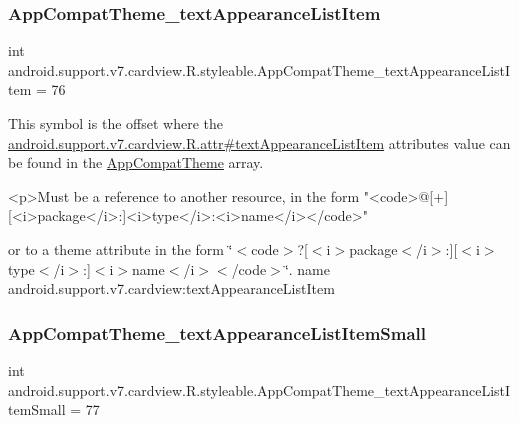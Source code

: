 \subsubsection{\texorpdfstring{App\+Compat\+Theme\+\_\+text\+Appearance\+List\+Item}{AppCompatTheme\_textAppearanceListItem}}
{\footnotesize\ttfamily int android.\+support.\+v7.\+cardview.\+R.\+styleable.\+App\+Compat\+Theme\+\_\+text\+Appearance\+List\+Item = 76\hspace{0.3cm}{\ttfamily [static]}}

This symbol is the offset where the \hyperlink{classandroid_1_1support_1_1v7_1_1cardview_1_1R_1_1attr_a504a1e2232cabe69718c28f8f8e1f022}{android.\+support.\+v7.\+cardview.\+R.\+attr\#text\+Appearance\+List\+Item} attribute\textquotesingle{}s value can be found in the \hyperlink{classandroid_1_1support_1_1v7_1_1cardview_1_1R_1_1styleable_a52e6f69f954ecc2622d72c0b4d298938}{App\+Compat\+Theme} array.

\begin{DoxyVerb}      <p>Must be a reference to another resource, in the form "<code>@[+][<i>package</i>:]<i>type</i>:<i>name</i></code>"
\end{DoxyVerb}
 or to a theme attribute in the form \char`\"{}$<$code$>$?\mbox{[}$<$i$>$package$<$/i$>$\+:\mbox{]}\mbox{[}$<$i$>$type$<$/i$>$\+:\mbox{]}$<$i$>$name$<$/i$>$$<$/code$>$\char`\"{}.  name android.\+support.\+v7.\+cardview\+:text\+Appearance\+List\+Item \mbox{\label{classandroid_1_1support_1_1v7_1_1cardview_1_1R_1_1styleable_a0dbb87b74ed823cda913ce4dc15a0df3}} 
\subsubsection{\texorpdfstring{App\+Compat\+Theme\+\_\+text\+Appearance\+List\+Item\+Small}{AppCompatTheme\_textAppearanceListItemSmall}}
{\footnotesize\ttfamily int android.\+support.\+v7.\+cardview.\+R.\+styleable.\+App\+Compat\+Theme\+\_\+text\+Appearance\+List\+Item\+Small = 77\hspace{0.3cm}{\ttfamily [static]}}

